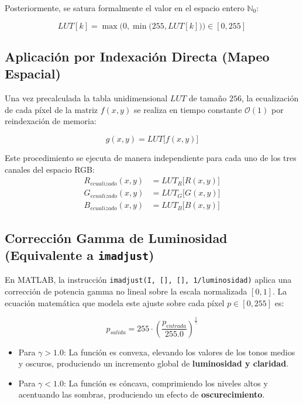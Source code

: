 \documentclass[12pt,a4paper]{article}
\begin{document}
Posteriormente, se satura formalmente el valor en el espacio entero $\mathbb{N}_0$:

\begin{equation}
LUT[k] = \max\Big(0, \min\big(255, LUT[k]\big)\Big) \in [0, 255]
\end{equation}

\subsection{Aplicación por Indexación Directa (Mapeo Espacial)}

Una vez precalculada la tabla unidimensional $LUT$ de tamaño $256$, la ecualización de cada píxel de la matriz $f(x, y)$ se realiza en tiempo constante $\mathcal{O}(1)$ por reindexación de memoria:

\begin{equation}
g(x, y) = LUT\big[ f(x, y) \big]
\end{equation}

Este procedimiento se ejecuta de manera independiente para cada uno de los tres canales del espacio RGB:
\begin{align}
R_{ecualizado}(x, y) &= LUT_R\big[ R(x, y) \big] \\
G_{ecualizado}(x, y) &= LUT_G\big[ G(x, y) \big] \\
B_{ecualizado}(x, y) &= LUT_B\big[ B(x, y) \big]
\end{align}

\subsection{Corrección Gamma de Luminosidad (Equivalente a \texttt{imadjust})}

En MATLAB, la instrucción \texttt{imadjust(I, [], [], 1/luminosidad)} aplica una corrección de potencia gamma no lineal sobre la escala normalizada $[0, 1]$. La ecuación matemática que modela este ajuste sobre cada píxel $p \in [0, 255]$ es:

\begin{equation}
p_{salida} = 255 \cdot \left( \frac{p_{entrada}}{255.0} \right)^{\frac{1}{\gamma}}
\end{equation}

\begin{itemize}
    \item Para $\gamma > 1.0$: La función es convexa, elevando los valores de los tonos medios y oscuros, produciendo un incremento global de \textbf{luminosidad y claridad}.
    \item Para $\gamma < 1.0$: La función es cóncava, comprimiendo los niveles altos y acentuando las sombras, produciendo un efecto de \textbf{oscurecimiento}.
\end{itemize}
\end{document}
